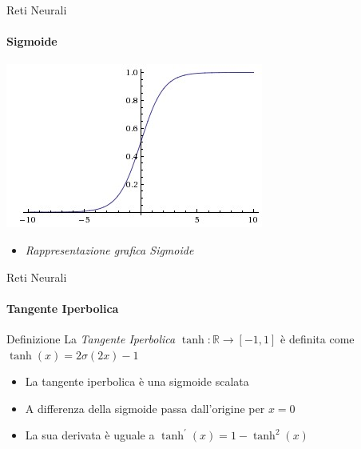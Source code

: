 \documentclass[
 ]{beamer}
\begin{document}
\begin{frame}{Reti Neurali}
    \framesubtitle{Sigmoide}
    
    \begin{center}
      \includegraphics[scale = 0.6]{sigmoid.jpeg}
    \end{center}
  
    \bigskip 
  
  \begin{itemize}
    \setlength\itemsep{1em}
    \item[] \large \emph{Rappresentazione grafica Sigmoide}
  \end{itemize}       
\end{frame} 



\begin{frame}{Reti Neurali}
    \framesubtitle{Tangente Iperbolica}
    \begin{block}{Definizione} 
        \large La \emph{Tangente Iperbolica} $\tanh: \mathbb{R} \rightarrow [-1, 1]$ è definita come $\tanh(x) = 2\sigma(2x) - 1$ 
    \end{block}\pause
    
    \bigskip
    
    \begin{itemize} [<+->]
        \setlength\itemsep{2em}
        \item \large La tangente iperbolica è una sigmoide scalata
        \item \large A differenza della sigmoide passa dall'origine per $x = 0$ 
        \item \large La sua derivata è uguale a $\tanh^{\prime}(x) = 1 - \tanh^{2}(x)$
    \end{itemize}
\end{frame}
\end{document}
